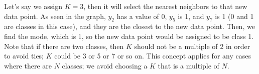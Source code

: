 \begin{center}
\end{center}

Let's say we assign $K = 3$, then it will select the nearest neighbors to that new data point.
As seen in the graph, $y_2$ has a value of 0, $y_5$ is 1, and $y_7$ is 1 (0 and 1 are classes in this case), and
they are the closest to the new data point. Then, we find the mode, which is 1, so
the new data point would be assigned to be class 1.\\
Note that if there are two classes, then $K$ should not be a multiple of 2 in order to avoid ties; $K$ could be
3 or 5 or 7 or so on. This concept applies for any cases where there are $N$ classes; we avoid choosing a $K$ that is a multiple of $N$.

